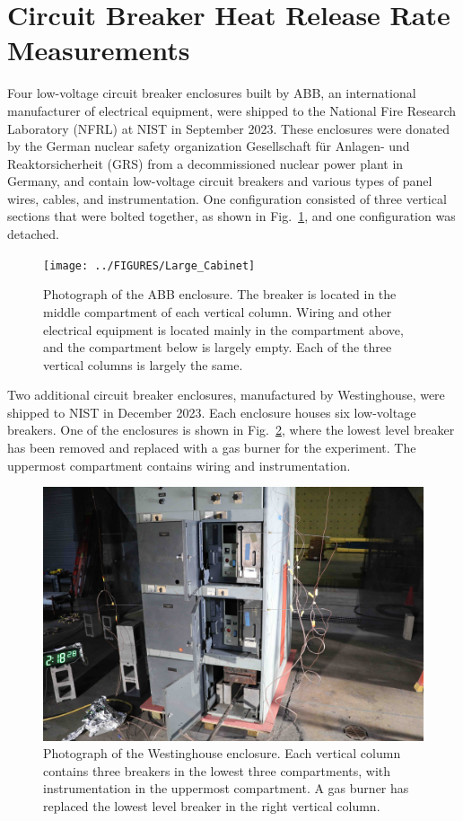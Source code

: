 \newpage

\section{Circuit Breaker Heat Release Rate Measurements}
\label{Sec:Circuit Breakers}

Four low-voltage circuit breaker enclosures built by ABB, an international manufacturer of electrical equipment, were shipped to the National Fire Research Laboratory (NFRL) at NIST in September 2023. These enclosures were donated by the German nuclear safety organization Gesellschaft für Anlagen- und Reaktorsicherheit (GRS) from a decommissioned nuclear power plant in Germany, and contain low-voltage circuit breakers and various types of panel wires, cables, and instrumentation. One configuration consisted of three vertical sections that were bolted together, as shown in Fig.~\ref{fig:Cabinet_1}, and one configuration was detached.

\begin{figure}[ht]
\centering
\texttt{[image: ../FIGURES/Large\_Cabinet]}
\caption[Photograph of ABB enclosure] {Photograph of the ABB enclosure. The breaker is located in the middle compartment of each vertical column. Wiring and other electrical equipment is located mainly in the compartment above, and the compartment below is largely empty. Each of the three vertical columns is largely the same.}
\label{fig:Cabinet_1}
\end{figure}

Two additional circuit breaker enclosures, manufactured by Westinghouse, were shipped to NIST in December 2023. Each enclosure houses six low-voltage breakers. One of the enclosures is shown in Fig.~\ref{fig:Cabinet_2}, where the lowest level breaker has been removed and replaced with a gas burner for the experiment. The uppermost compartment contains wiring and instrumentation.

\begin{figure}[ht]
\centering
\includegraphics[width=\textwidth]{../FIGURES/Westinghouse}
\caption[Photograph of Westinghouse enclosure] {Photograph of the Westinghouse enclosure. Each vertical column contains three breakers in the lowest three compartments, with instrumentation in the uppermost compartment. A gas burner has replaced the lowest level breaker in the right vertical column.}
\label{fig:Cabinet_2}
\end{figure}

